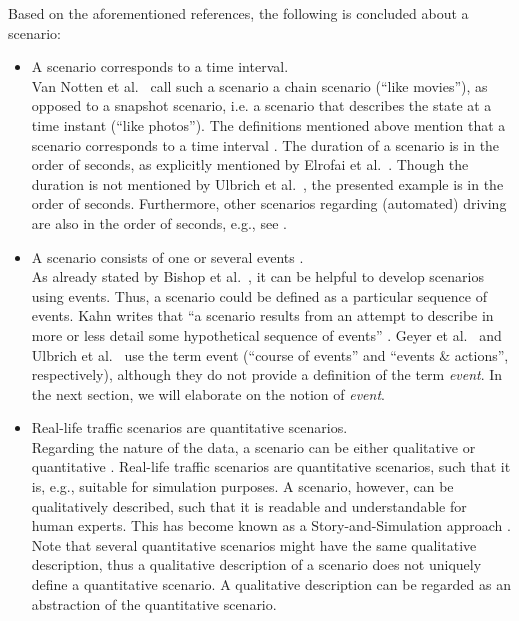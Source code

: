 Based on the aforementioned references, the following is concluded about a scenario:
\begin{itemize}
	\item A scenario corresponds to a time interval. \\
	Van Notten et al.\ \cite{vannotten2003updated} call such a scenario a chain scenario (``like movies''), as opposed to a snapshot scenario, i.e. a scenario that describes the state at a time instant (``like photos''). The definitions mentioned above mention that a scenario corresponds to a time interval \cite{go2004blind, geyer2014, ulbrich2015, elrofai2016scenario}. The duration of a scenario is in the order of seconds, as explicitly mentioned by Elrofai et al.\ \cite{elrofai2016scenario}. Though the duration is not mentioned by Ulbrich et al.\ \cite{ulbrich2015}, the presented example is in the order of seconds. Furthermore, other scenarios regarding (automated) driving are also in the order of seconds, e.g., see \cite{gietelink2006development, zofka2015datadrivetrafficscenarios, roesener2017comprehensive, karaduman2013interactivebehavior, hulshof2013autonomous, englund2016grand}.
	
	\item A scenario consists of one or several events \cite{vannotten2003updated, go2004blind, geyer2014, ulbrich2015, kahn1962, englund2016grand, schoemaker1993multiple, cuppens2002alert}. \\
	As already stated by Bishop et al.\ \cite{bishop2007scentechniques}, it can be helpful to develop scenarios using events. Thus, a scenario could be defined as a particular sequence of events.  Kahn writes that ``a scenario results from an attempt to describe in more or less detail some hypothetical sequence of events'' \cite{kahn1962}. Geyer et al.\ \cite{geyer2014} and Ulbrich et al.\ \cite{ulbrich2015} use the term event (``course of events'' and ``events \& actions'', respectively), although they do not provide a definition of the term \emph{event}. In the next section, we will elaborate on the notion of \emph{event}.
	
	\item Real-life traffic scenarios are quantitative scenarios. \\
	Regarding the nature of the data, a scenario can be either qualitative or quantitative \cite{vannotten2003updated}. Real-life traffic scenarios are quantitative scenarios, such that it is, e.g., suitable for simulation purposes. A scenario, however, can be qualitatively described, such that it is readable and understandable for human experts. This has become known as a Story-and-Simulation approach \cite{alcamo2001scenarios}. Note that several quantitative scenarios might have the same qualitative description, thus a qualitative description of a scenario does not uniquely define a quantitative scenario. A qualitative description can be regarded as an abstraction of the quantitative scenario.
	

\end{itemize}
